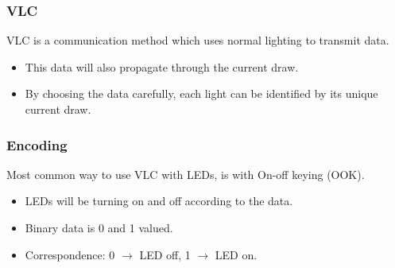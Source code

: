 \documentclass{beamer}
\begin{document}
	\begin{frame}\frametitle{VLC}

		VLC is a communication method which uses normal lighting to transmit data.

		\begin{itemize}

			\item This data will also propagate through the current draw.

			\item By choosing the data carefully, each light can be identified by its unique current draw.

		\end{itemize}

	\end{frame}






	\begin{frame}\frametitle{Encoding}

		Most common way to use VLC with LEDs, is with On-off keying (OOK).

		\begin{itemize}

			\item LEDs will be turning on and off according to the data.

			\item Binary data is 0 and 1 valued.

			\item Correspondence: 0 $\xrightarrow{}$ LED off, 1 $\xrightarrow{}$ LED on.

		\end{itemize}
	\end{frame}
\end{document}
